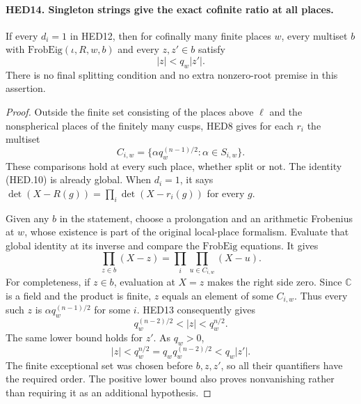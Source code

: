 \paragraph{HED14. Singleton strings give the exact cofinite ratio at all places.}
\label{claim:HED14}
If every \(d_i=1\) in HED12, then for cofinally many finite places
\(w\), every multiset \(b\) with
\(\mathrm{FrobEig}(\iota,R,w,b)\) and every \(z,z'\in b\) satisfy
\[
                             |z|<q_w|z'|.
 \tag{HED.12}
\]
There is no final splitting condition and no extra nonzero-root
premise in this assertion.
\begin{proof}
Outside the finite set consisting of the places above \(\ell\)
and the nonspherical places of the finitely many cusps, HED8 gives
for each \(r_i\) the multiset
\[
                  C_{i,w}=\{\alpha q_w^{(n-1)/2}:
                                              \alpha\in S_{i,w}\}.
\]
These comparisons hold at every such place, whether split or not.
The identity (HED.10) is already global.  When \(d_i=1\), it says
\(\det(X-R(g))=\prod_i\det(X-r_i(g))\) for every \(g\).

Given any \(b\) in the statement, choose a prolongation and an
arithmetic Frobenius at \(w\), whose existence is part of the
original local-place formalism.  Evaluate that global identity at
its inverse and compare the \(\mathrm{FrobEig}\) equations.  It gives
\[
                  \prod_{z\in b}(X-z)
                         =\prod_i\prod_{u\in C_{i,w}}(X-u).
\]
For completeness, if \(z\in b\), evaluation at \(X=z\) makes the
right side zero.  Since \(\mathbb C\) is a field and the product
is finite, \(z\) equals an element of some \(C_{i,w}\).  Thus
every such \(z\) is \(\alpha q_w^{(n-1)/2}\) for some \(i\).
HED13 consequently gives
\[
                    q_w^{(n-2)/2}<|z|<q_w^{n/2}.
 \tag{HED.13}
\]
The same lower bound holds for \(z'\).  As \(q_w>0\),
\[
             |z|<q_w^{n/2}
                    =q_w q_w^{(n-2)/2}<q_w|z'|.
\]
The finite exceptional set was chosen before \(b,z,z'\), so all
their quantifiers have the required order.  The positive lower
bound also proves nonvanishing rather than requiring it as an
additional hypothesis.
\end{proof}

